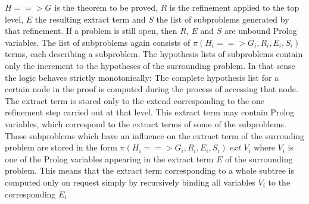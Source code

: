 \documentclass[11pt]{report}
\newcommand{\inv}[1]{\index{#1}}
\begin{document}
 $H==>G$ is the theorem to be proved, $R$ is the refinement
 applied to the top level, $E$ the resulting extract term and
 $S$ the list of subproblems generated by that refinement.
 If a problem is still open, then $R$, $E$ and $S$ are 
 unbound Prolog variables. The list of subproblems again consists of 
 $\pi(H_i==>G_i,R_i,E_i,S_i)$ terms, each describing a subproblem.
 The hypothesis lists of subproblems contain only the
 increment to the hypotheses of the surrounding problem.
 In that sense the logic behaves strictly monotonically: The complete 
 hypothesis list for a certain node in the proof is computed
 during the process of accessing that node. 
 The extract term is stored only to the extend corresponding to
 the one refinement step carried out at that level. This extract
 term may contain Prolog variables, which correspond to the
 extract terms of some of the subproblems. Those subproblems
 which have an influence on  the extract term of the surrouding
 problem are stored in the form $\pi(H_i==>G_i,R_i,E_i,S_i)\;ext\;V_i$
 where $V_i$ is one of the Prolog variables appearing in the extract
 term $E$ of the surrounding problem. This means that the extract
 term corresponding to a whole subtree is computed only on request
 simply by recursively binding all variables $V_i$ to the 
 corresponding $E_i$
 \inv{$\triangle_{=:}$} \inv{$\vartheta_{\it universe}$} \inv{$\vartheta_{\it autotactic}$} 
\end{document}
